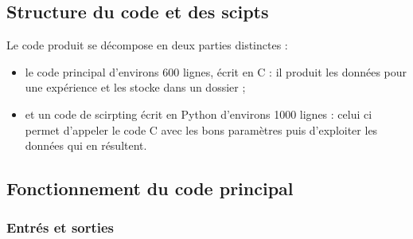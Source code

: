 \documentclass[a4paper, 11pt]{article}
\begin{document}
\subsection{Structure du code et des scipts}

Le code produit se décompose en deux parties distinctes :
\begin{itemize}
    \item le code principal d'environs 600 lignes, écrit en C  : il produit les données pour une expérience
        et les stocke dans un dossier ;
    \item et un code de scirpting écrit en Python d'environs 1000 lignes : celui ci permet d'appeler le code C avec
        les bons paramètres puis d'exploiter les données qui en résultent.
\end{itemize}

\subsection{Fonctionnement du code principal}

\subsubsection{Entrés et sorties}
\end{document}
